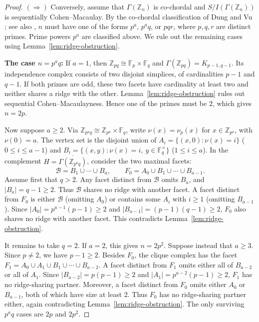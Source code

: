 \documentclass[12pt, reqno]{amsart}
\theoremstyle{definition}
\numberwithin{equation}{section}
\begin{document}
\begin{proof}
		$(\Longrightarrow)$ Conversely, assume that $\Gamma(\mathbb Z_n)$ is co-chordal and $S/I(\Gamma(\mathbb Z_n))$ is sequentially Cohen--Macaulay. By the co-chordal classification of Dung and Vu \cite{dung2026}; see also \cite{rather2026}, $n$ must have one of the forms $p^a$, $p^a q$, or $pqr$, where $p,q,r$ are distinct primes. Prime powers $p^a$ are classified above. We rule out the remaining cases using Lemma~\ref{lem:ridge-obstruction}.
		
		\textbf{The case $n=p^a q$:} 
		If $a=1$, then $\mathbb Z_{pq}\cong\mathbb F_p\times\mathbb F_q$ and $\Gamma(\mathbb Z_{pq})=K_{p-1,q-1}$. Its independence complex consists of two disjoint simplices, of cardinalities $p-1$ and $q-1$. If both primes are odd, these two facets have cardinality at least two and neither shares a ridge with the other. Lemma~\ref{lem:ridge-obstruction} rules out sequential Cohen--Macaulayness. Hence one of the primes must be $2$, which gives $n=2p$.
		
		Now suppose $a\ge2$. Via $\mathbb Z_{p^a q}\cong\mathbb Z_{p^a}\times\mathbb F_q$, write $\nu(x)=\nu_p(x)$ for $x\in\mathbb Z_{p^a}$, with $\nu(0)=a$. The vertex set is the disjoint union of $A_i=\{(x,0):\nu(x)=i\}$ ($0\le i\le a-1$) and $B_i=\{(x,y):\nu(x)=i,\ y\in\mathbb F_q^\times\}$ ($1\le i\le a$). In the complement $H=\overline{\Gamma(\mathbb Z_{p^a q})}$, consider the two maximal facets:
		\[
		\mathcal B=B_1\cup\cdots\cup B_a,
		\qquad
		F_0=A_0\cup B_1\cup\cdots\cup B_{a-1}.
		\]
		Assume first that $q>2$. Any facet distinct from $\mathcal B$ omits $B_a$, and $|B_a|=q-1\ge2$. Thus $\mathcal B$ shares no ridge with another facet. A facet distinct from $F_0$ is either $\mathcal B$ (omitting $A_0$) or contains some $A_i$ with $i\ge1$ (omitting $B_{a-1}$). Since $|A_0|=p^{a-1}(p-1)\ge2$ and $|B_{a-1}|=(p-1)(q-1)\ge2$, $F_0$ also shares no ridge with another facet. This contradicts Lemma~\ref{lem:ridge-obstruction}. 
		
		It remains to take $q=2$. If $a=2$, this gives $n=2p^2$. Suppose instead that $a\ge3$. Since $p\ne2$, we have $p-1\ge2$. Besides $F_0$, the clique complex has the facet $F_1=A_0\cup A_1\cup B_1\cup\cdots\cup B_{a-2}$. A facet distinct from $F_1$ omits either all of $B_{a-2}$ or all of $A_1$. Since $|B_{a-2}|=p(p-1)\ge2$ and $|A_1|=p^{a-2}(p-1)\ge2$, $F_1$ has no ridge-sharing partner. Moreover, a facet distinct from $F_0$ omits either $A_0$ or $B_{a-1}$, both of which have size at least 2. Thus $F_0$ has no ridge-sharing partner either, again contradicting Lemma~\ref{lem:ridge-obstruction}. The only surviving $p^a q$ cases are $2p$ and $2p^2$.
		

\end{proof}
\end{document}
